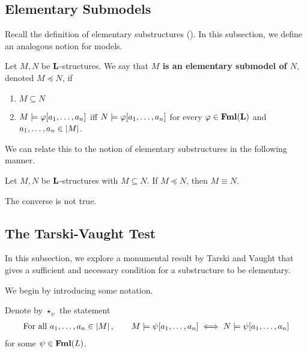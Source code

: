 \subsection{Elementary Submodels}

Recall the definition of elementary substructures (\sorry). In this subsection, we define an analogous notion for models.

\begin{boxdefinition}
    Let $M, N$ be $\mathbf{L}$-structures. We say that \textbf{$M$ is an elementary submodel of $N$}, denoted $M \preceq N$, if
    \begin{enumerate}
        \item $M \subseteq N$
        \item $M \models \varphi\!\left[ a_1, \ldots, a_n \right]$ iff $N \models \varphi\!\left[ a_1, \ldots, a_n \right]$ for every $\varphi \in \mathbf{Fml}\!\left( \mathbf{L} \right)$ and $a_1, \ldots, a_n \in \left\lvert M \right\rvert$.
    \end{enumerate}
\end{boxdefinition}

We can relate this to the notion of elementary substructures in the following manner.

\begin{boxtheorem}
    Let $M, N$ be $\mathbf{L}$-structures with $M \subseteq N$. If $M \preceq N$, then $M \equiv N$.
\end{boxtheorem}

The converse is not true.

\begin{boxcexample}
    \sorry
\end{boxcexample}

\subsection{The Tarski-Vaught Test}

In this subsection, we explore a monumental result by Tarski and Vaught that gives a sufficient and necessary condition for a substructure to be elementary.

We begin by introducing some notation.

\begin{boxlnotation}
    Denote by $\star_{\psi}$ the statement
    \begin{align}
        \text{For all } a_1, \ldots, a_n \in \left\lvert M \right\rvert,
        \qquad
        M \models \psi\!\left[ a_1, \ldots, a_n \right]
        \iff
        N \models \psi\!\left[ a_1, \ldots, a_n \right]
    \end{align}
    for some $\psi \in \mathbf{Fml}(L)$.
\end{boxlnotation}

